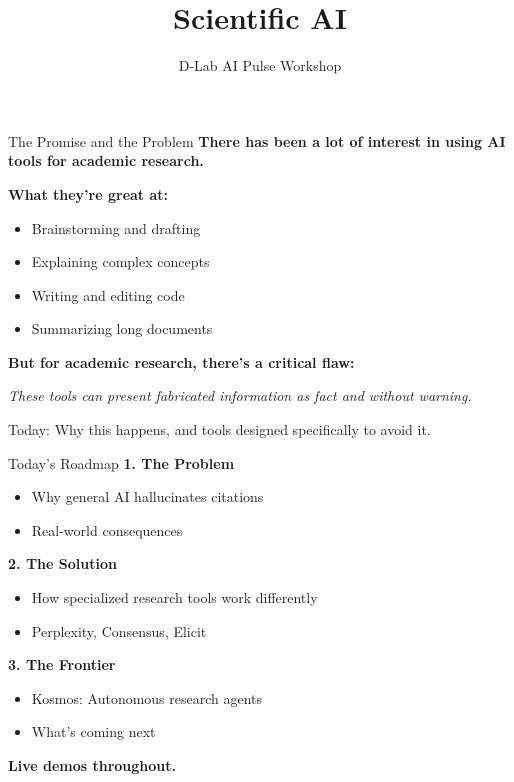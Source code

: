 \documentclass[aspectratio=169]{beamer}
\title{Scientific AI}
\subtitle{D-Lab AI Pulse Workshop}
\author{}
\date{}
\begin{document}
\begin{frame}[plain]
    \titlepage
\end{frame}


\begin{frame}{The Promise and the Problem}
    \textbf{There has been a lot of interest in using AI tools for academic research.}

    \vspace{1em}
    \textbf{What they're great at:}
    \begin{itemize}
        \item Brainstorming and drafting
        \item Explaining complex concepts
        \item Writing and editing code
        \item Summarizing long documents
    \end{itemize}

    \vspace{1em}
    \textbf{But for academic research, there's a critical flaw:}

    \vspace{0.5em}
    \textit{These tools can present fabricated information as fact and without warning.}

    \vspace{1em}
    Today: Why this happens, and tools designed specifically to avoid it.
\end{frame}

\begin{frame}{Today's Roadmap}
    \textbf{1. The Problem}
    \begin{itemize}
        \item Why general AI hallucinates citations
        \item Real-world consequences
    \end{itemize}

    \vspace{1em}
    \textbf{2. The Solution}
    \begin{itemize}
        \item How specialized research tools work differently
        \item Perplexity, Consensus, Elicit
    \end{itemize}

    \vspace{1em}
    \textbf{3. The Frontier}
    \begin{itemize}
        \item Kosmos: Autonomous research agents
        \item What's coming next
    \end{itemize}

    \vspace{1em}
    \textbf{Live demos throughout.}
\end{frame}
\end{document}
